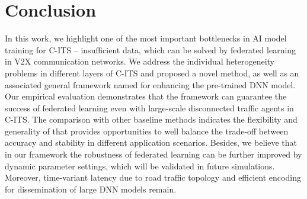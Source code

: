 \section{Conclusion}
\label{sec:conclusion}
In this work, we highlight one of the most important bottlenecks in AI model training for C-ITS -- insufficient data, which can be solved by federated learning in V2X communication networks. We address the individual heterogeneity problems in different layers of C-ITS and proposed a novel method, as well as an associated general framework named {\myHFed} for enhancing the pre-trained DNN model. Our empirical evaluation demonstrates that the framework can guarantee the success of federated learning even with large-scale disconnected traffic agents in C-ITS. The comparison with other baseline methods indicates the flexibility and generality of {\myHFed} that provides opportunities to well balance the trade-off between accuracy and stability in different application scenarios. 
Besides, we believe that in our framework the robustness of federated learning can be further improved by dynamic parameter settings, which will be validated in future simulations. Moreover, time-variant latency due to road traffic topology and efficient encoding for dissemination of large DNN models remain.